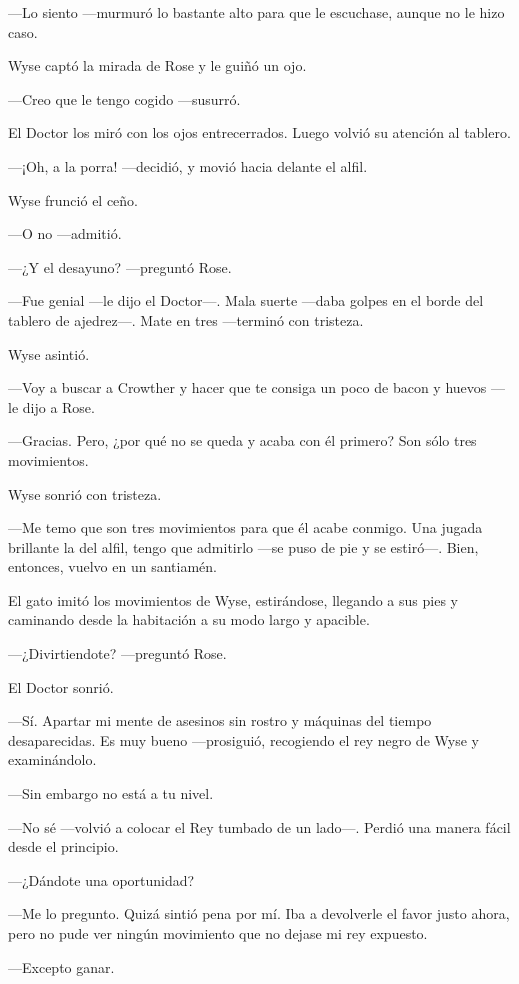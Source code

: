 {---Lo siento ---murmuró lo bastante alto para que le escuchase, aunque
no le hizo caso.}

{Wyse captó la mirada de Rose y le guiñó un ojo.}

{---Creo que le tengo cogido ---susurró.}

{El Doctor los miró con los ojos entrecerrados. Luego volvió su atención
al tablero.}

{---¡Oh, a la porra! ---decidió, y movió hacia delante el alfil.}

{Wyse frunció el ceño.}

{---O no ---admitió.}

{---¿Y el desayuno? ---preguntó Rose.}

{---Fue genial ---le dijo el Doctor---. Mala suerte ---daba golpes en el
borde del tablero de ajedrez---. Mate en tres ---terminó con tristeza.}

{Wyse asintió.}

{---Voy a buscar a Crowther y hacer que te consiga un poco de bacon y
huevos ---le dijo a Rose.}

{---Gracias. Pero, ¿por qué no se queda y acaba con él primero? Son
sólo tres movimientos.}

{Wyse sonrió con tristeza.}

{---Me temo que son tres movimientos para que él acabe conmigo. Una
	jugada brillante la del alfil, tengo que admitirlo ---se puso de pie y
se estiró---. Bien, entonces, vuelvo en un santiamén.}

{El gato imitó los movimientos de Wyse, estirándose, llegando a sus pies
y caminando desde la habitación a su modo largo y apacible.}

{---¿Divirtiendote? ---preguntó Rose.}

{El Doctor sonrió.}

{---Sí. Apartar mi mente de asesinos sin rostro y máquinas del tiempo
	desaparecidas. Es muy bueno ---prosiguió, recogiendo el rey negro de
Wyse y examinándolo.}

{---Sin embargo no está a tu nivel.}

{---No sé ---volvió a colocar el Rey tumbado de un lado---. Perdió una
manera fácil desde el principio.}

{---¿Dándote una oportunidad?}

{---Me lo pregunto. Quizá sintió pena por mí. Iba a devolverle el favor
	justo ahora, pero no pude ver ningún movimiento que no dejase mi rey
expuesto.}

{---Excepto ganar.}

